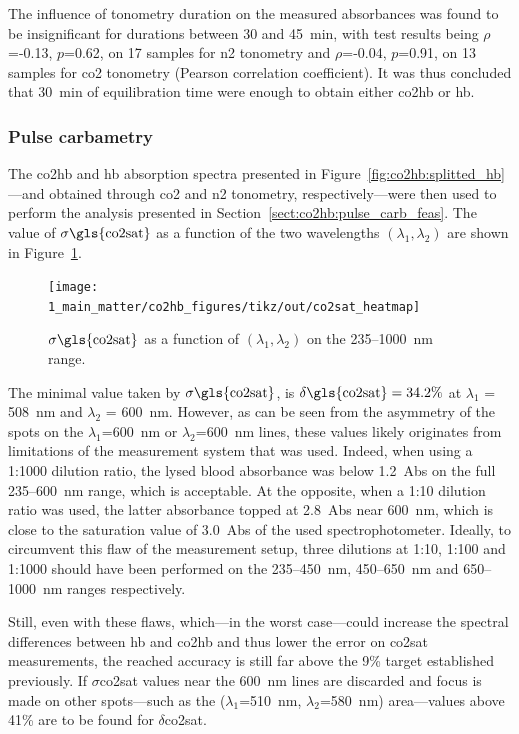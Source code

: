 The influence of tonometry duration on the measured absorbances was found to be insignificant for durations between 30 and 45~min, with test results being {$\rho$}=-0.13, {$p$}=0.62, on 17 samples for {\gls{n2}} tonometry and {$\rho$}=-0.04, {$p$}=0.91, on 13 samples for {\gls{co2}} tonometry (Pearson correlation coefficient). It was thus concluded that 30~min of equilibration time were enough to obtain either {\gls{co2hb}} or {\gls{hb}}.

\subsubsection{Pulse carbametry}

The \gls{co2hb} and \gls{hb} absorption spectra presented in Figure~\ref{fig:co2hb:splitted_hb}---and obtained through \gls{co2} and \gls{n2} tonometry, respectively---were then used to perform the analysis presented in Section~\ref{sect:co2hb:pulse_carb_feas}. The value of $\sigma\text{\gls{co2sat}}$ as a function of the two wavelengths $(\lambda_1, \lambda_2)$ are shown in Figure~\ref{fig:co2hb:satco2_err}.

\begin{figure}
	\centering
	\texttt{[image: 1\_main\_matter/co2hb\_figures/tikz/out/co2sat\_heatmap]}
	\caption{$\sigma\text{\gls{co2sat}}$ as a function of $(\lambda_1, \lambda_2)$ on the 235--1000~nm range.}
	\label{fig:co2hb:satco2_err}
\end{figure}

The minimal value taken by $\sigma\text{\gls{co2sat}}$, is $\delta\text{\gls{co2sat}} = 34.2\%$ at $\lambda_1$ = 508~nm and $\lambda_2$ = 600~nm. However, as can be seen from the asymmetry of the spots on the $\lambda_1$=600~nm or $\lambda_2$=600~nm lines, these values likely originates from limitations of the measurement system that was used. Indeed, when using a 1:1000 dilution ratio, the lysed blood absorbance was below 1.2~Abs on the full 235--600~nm range, which is acceptable. At the opposite, when a 1:10 dilution ratio was used, the latter absorbance topped at 2.8~Abs near 600~nm, which is close to the saturation value of 3.0~Abs of the used spectrophotometer. Ideally, to circumvent this flaw of the measurement setup, three dilutions at 1:10, 1:100 and 1:1000 should have been performed on the 235--450~nm, 450--650~nm and 650--1000~nm ranges respectively.

Still, even with these flaws, which---in the worst case---could increase the spectral differences between \gls{hb} and \gls{co2hb} and thus lower the error on \gls{co2sat} measurements, the reached accuracy is still far above the 9\% target established previously. If $\sigma$\gls{co2sat} values near the 600~nm lines are discarded and focus is made on other spots---such as the ($\lambda_1$=510~nm, $\lambda_2$=580~nm) area---values above 41\% are to be found for $\delta$\gls{co2sat}.

